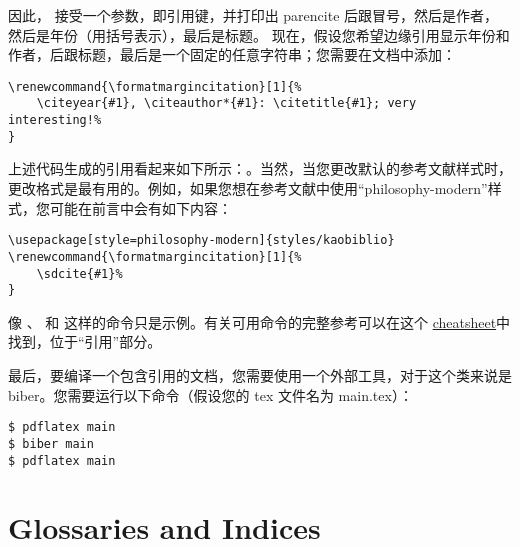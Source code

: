 \newpage

因此， 接受一个参数，即引用键，并打印出 parencite 后跟冒号，然后是作者，然后是年份（用括号表示），最后是标题。  现在，假设您希望边缘引用显示年份和作者，后跟标题，最后是一个固定的任意字符串；您需要在文档中添加：


\begin{lstlisting}[breaklines,columns=flexible,style=kaolstplain,linewidth=1.5\textwidth]
\renewcommand{\formatmargincitation}[1]{%
	\citeyear{#1}, \citeauthor*{#1}: \citetitle{#1}; very interesting!%
}
\end{lstlisting}

\renewcommand{\formatmargincitation}[1]{%
	\citeyear{#1}, \citeauthor*{#1}: \citetitle{#1}; very interesting!%
}

上述代码生成的引用看起来如下所示：。当然，当您更改默认的参考文献样式时，更改格式是最有用的。例如，如果您想在参考文献中使用“philosophy-modern”样式，您可能在前言中会有如下内容：

\begin{lstlisting}[breaklines,columns=flexible,style=kaolstplain,linewidth=1.5\textwidth]
\usepackage[style=philosophy-modern]{styles/kaobiblio}
\renewcommand{\formatmargincitation}[1]{%
	\sdcite{#1}%
}

\end{lstlisting}


\renewcommand{\formatmargincitation}[1]{%
	\parencite{#1}: \citeauthor*{#1} (\citeyear{#1}), \citetitle{#1}%
}

像 、 和  这样的命令只是示例。有关可用命令的完整参考可以在这个 \href{http://tug.ctan.org/info/biblatex-cheatsheet/biblatex-cheatsheet.pdf}{cheatsheet}中找到，位于\enquote{引用}部分。

最后，要编译一个包含引用的文档，您需要使用一个外部工具，对于这个类来说是 biber。您需要运行以下命令（假设您的 tex 文件名为 main.tex）：

\begin{lstlisting}[style=kaolstplain]
$ pdflatex main
$ biber main
$ pdflatex main
\end{lstlisting}

\section{Glossaries and Indices}


